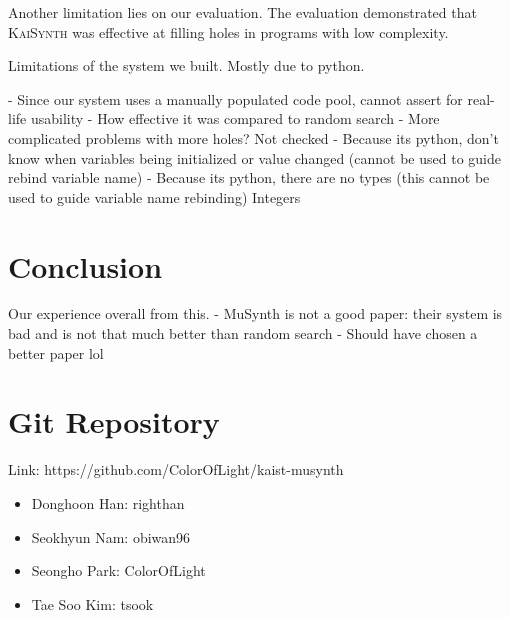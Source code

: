 \documentclass{article}
\begin{document}
Another limitation lies on our evaluation. The evaluation demonstrated that \textsc{KaiSynth} was effective at filling holes in programs with low complexity. 

Limitations of the system we built. Mostly due to python.

 - Since our system uses a manually populated code pool, cannot assert for real-life usability
 - How effective it was compared to random search
 - More complicated problems with more holes? Not checked
 - Because its python, don't know when variables being initialized or value changed
   (cannot be used to guide rebind variable name)
 - Because its python, there are no types (this cannot be used to guide variable name rebinding)
Integers 


\section{Conclusion}
Our experience overall from this.
 - MuSynth is not a good paper: their system is bad and is not that much better than random search
 - Should have chosen a better paper lol
 
\section{Git Repository}
Link: https://github.com/ColorOfLight/kaist-musynth
\begin{itemize}
    \item Donghoon Han: righthan
    \item Seokhyun Nam: obiwan96
    \item Seongho Park: ColorOfLight
    \item Tae Soo Kim: tsook
\end{itemize}

\printbibliography
\end{document}
